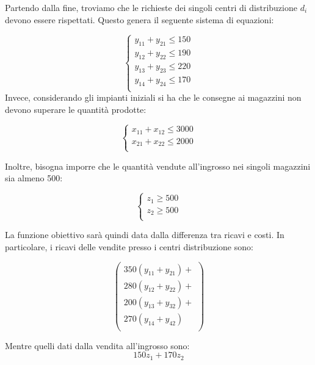 \documentclass{article}
\begin{document}
Partendo dalla fine, troviamo che le richieste dei singoli centri di 
distribuzione $d_i$ devono essere rispettati. Questo genera il seguente sistema 
di equazioni:

\begin{equation*}
  \begin{cases}
  y_{11} + y_{21} \leq 150\\
  y_{12} + y_{22} \leq 190\\
  y_{13} + y_{23} \leq 220\\
  y_{14} + y_{24} \leq 170\\
  \end{cases}
\end{equation*}
Invece, considerando gli impianti iniziali si ha che le consegne ai magazzini 
non devono superare le quantità prodotte:

\begin{equation*}
  \begin{cases}
  x_{11} + x_{12} \leq 3000\\
  x_{21} + x_{22} \leq 2000\\
  \end{cases}
\end{equation*}

Inoltre, bisogna imporre che le quantità vendute all'ingrosso nei singoli 
magazzini sia almeno 500:

\begin{equation*}
  \begin{cases}
  z_1 \geq 500 \\
  z_2 \geq 500\\
  \end{cases}
\end{equation*}

La funzione obiettivo sarà quindi data dalla differenza tra ricavi e costi. 
In particolare, i ricavi delle vendite presso i centri distribuzione sono:

\begin{equation*}
  \begin{pmatrix}
    350(y_{11} + y_{21}) + \\
    280(y_{12} + y_{22}) + \\
    200(y_{13} + y_{32}) + \\
    270(y_{14} + y_{42})  \\
  \end{pmatrix}
\end{equation*}

Mentre quelli dati dalla vendita all'ingrosso sono:
\begin{equation*}
    150z_1 + 170z_2
\end{equation*}
\end{document}
